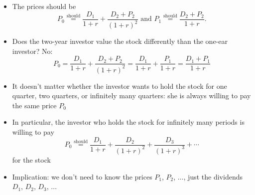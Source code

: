 \documentclass{beamer}
\newcommand{\should}{\overset{\text{should}}{=}}
\begin{document}
\begin{frame}{}
	\begin{figure}[H]
		\begin{center}
		\end{center}
	\end{figure}
\begin{itemize}
\item The prices should be
\begin{equation*}
	P_{0}\should\frac{D_{1}}{1+r}+\frac{D_{2}+P_{2}}{(1+r)^2}\text{ and } P_{1}\should\frac{D_{2}+P_{2}}{1+r}.
\end{equation*}
\item Does the two-year investor value the stock differently than the one-ear investor? No:
\begin{equation*}
	P_{0}=\frac{D_{1}}{1+r}+\frac{D_{2}+P_{2}}{(1+r)^2}=\frac{D_{1}}{1+r}+\frac{P_{1}}{1+r}=\frac{D_{1}+P_{1}}{1+r}
\end{equation*}
\end{itemize}
\end{frame}

\begin{frame}{}
	\begin{itemize}
		\item It doesn't matter whether the investor wants to hold the stock for one quarter, two quarters, or infinitely many quarters: she is always willing to pay the same price $P_{0}$
		\item In particular, the investor who holds the stock for infinitely many periods is willing to pay 
		\begin{equation*}
			P_{0}\should\frac{D_{1}}{1+r}+\frac{D_{2}}{(1+r)^2}+\frac{D_{3}}{(1+r)^3}+\cdots 
		\end{equation*}
		for the stock
		\item Implication: we don't need to know the prices $P_{1}$, $P_{2}$, $\ldots$, just the dividends $D_{1}$, $D_{2}$, $D_{3}$, $\ldots$
	\end{itemize}
\end{frame}
\end{document}
